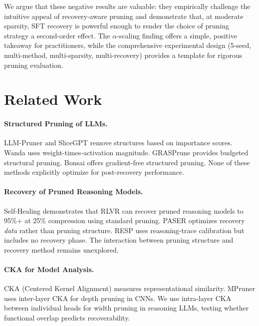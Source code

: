 \documentclass[11pt,a4paper]{article}
\begin{document}
We argue that these negative results are valuable: they empirically challenge the intuitive appeal of recovery-aware pruning and demonstrate that, at moderate sparsity, SFT recovery is powerful enough to render the choice of pruning strategy a second-order effect. The $\alpha$-scaling finding offers a simple, positive takeaway for practitioners, while the comprehensive experimental design (5-seed, multi-method, multi-sparsity, multi-recovery) provides a template for rigorous pruning evaluation.


\section{Related Work}
\label{sec:related}

\paragraph{Structured Pruning of LLMs.}
LLM-Pruner \cite{ma2024llmpruner} and SliceGPT \cite{ashkboos2024slicegpt} remove structures based on importance scores. Wanda \cite{sun2024wanda} uses weight-times-activation magnitude. GRASPrune \cite{graspune2026} provides budgeted structural pruning. Bonsai \cite{bonsai2025} offers gradient-free structured pruning. None of these methods explicitly optimize for post-recovery performance.

\paragraph{Recovery of Pruned Reasoning Models.}
Self-Healing \cite{selfhealing2025} demonstrates that RLVR can recover pruned reasoning models to 95\%+ at 25\% compression using standard pruning. PASER \cite{paser2025} optimizes recovery \emph{data} rather than pruning structure. RESP \cite{resp2025} uses reasoning-trace calibration but includes no recovery phase. The interaction between pruning structure and recovery method remains unexplored.

\paragraph{CKA for Model Analysis.}
CKA (Centered Kernel Alignment) \cite{kornblith2019similarity} measures representational similarity. MPruner \cite{mpruner2024} uses inter-layer CKA for depth pruning in CNNs. We use intra-layer CKA between individual heads for width pruning in reasoning LLMs, testing whether functional overlap predicts recoverability.
\end{document}
